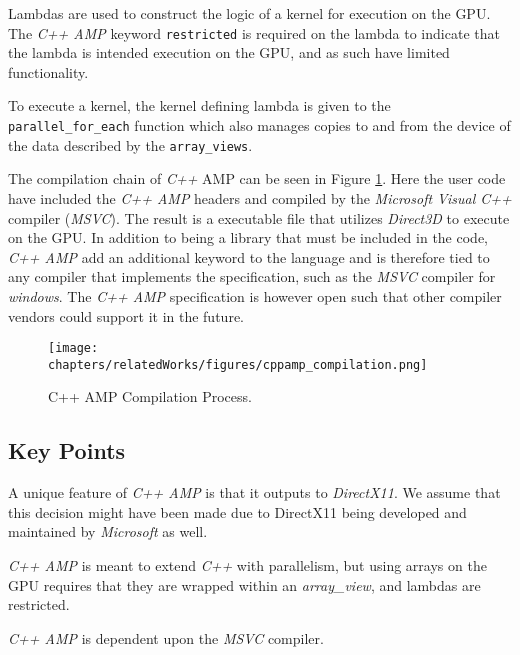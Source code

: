 Lambdas are used to construct the logic of a kernel for execution on the GPU. The \textit{C++ AMP} keyword \texttt{restricted} is required on the lambda to indicate that the lambda is intended execution on the GPU, and as such have limited functionality. 

To execute a kernel, the kernel defining lambda is given to the \texttt{parallel\_for\_each} function which also manages copies to and from the device of the data described by the \texttt{array\_views}.

The compilation chain of \textit{C++} AMP can be seen in Figure \ref{fig:cppampCompilation}. Here the user code have included the \textit{C++ AMP} headers and compiled by the \textit{Microsoft Visual C++} compiler (\textit{MSVC}). The result is a executable file that utilizes \textit{Direct3D} to execute on the GPU. In addition to being a library that must be included in the code, \textit{C++ AMP} add an additional keyword to the language and is therefore tied to any compiler that implements the specification, such as the \textit{MSVC} compiler for \textit{windows}. The \textit{C++ AMP} specification is however open such that other compiler vendors could support it in the future.

\begin{figure}[H]
\center
\texttt{[image: chapters/relatedWorks/figures/cppamp\_compilation.png]}
\caption{C++ AMP Compilation Process.}
\label{fig:cppampCompilation}
\end{figure}

\subsection{Key Points}
A unique feature of \textit{C++ AMP} is that it outputs to \textit{DirectX11}. We assume that this decision might have been made due to DirectX11 being developed and maintained by \textit{Microsoft} as well.

\textit{C++ AMP} is meant to extend \textit{C++} with parallelism, but using arrays on the GPU requires that they are wrapped within an \textit{array\_view}, and lambdas are restricted. 

\textit{C++ AMP} is dependent upon the \textit{MSVC} compiler.
